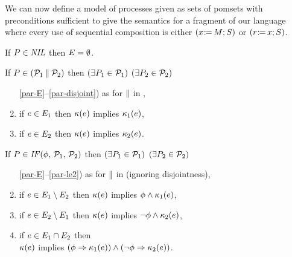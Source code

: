 We can now define a model of processes given as sets of pomsets with preconditions
sufficient to give the semantics for a fragment of our language
where every use of sequential composition is either
$(x\mkern1mu\mathtt{:}\mkern-1mu\mathtt{=}\,M\mathtt{;}\,\allowbreak S)$ or
$(r\mkern1mu\mathtt{:}\mkern-1mu\mathtt{=}\,x\mathtt{;}\,\allowbreak S)$.
\begin{definition}%
  \label{def:pomsets-pre}
  
  \noindent
  If $P\in\textnormal{\textit{NIL}}$ then $E = \emptyset$.

  \noindent
  If $P \in (\mathcal{P}_1\mathbin{\parallel}\mathcal{P}_2)$ then
  $(\exists P_1\in\mathcal{P}_1)$ $(\exists P_2\in\mathcal{P}_2)$
  \begin{enumerate}
    \setcounter{enumi}{\value{pomsetParDisjointCount}}
  \item[\ref{par-E}--\ref{par-disjoint})]
    as for $\mathbin{\parallel}$ in ,
  \item \label{par-kappa1}
    if $e\in E_1$ then $\kappa(e)$ implies $\kappa_1(e)$,
  \item \label{par-kappa2}
    if $e\in E_2$ then $\kappa(e)$ implies $\kappa_2(e)$.
    \setcounter{pomsetPreParCount}{\value{enumi}}
  \end{enumerate}

  \noindent
  If $\aPS \in \sIF{\aForm}\sTHEN\aPSS_1\sELSE\aPSS_2\sFI$ then
  $(\exists P_1\in\mathcal{P}_1)$ $(\exists P_2\in\mathcal{P}_2)$
  \begin{enumerate}
    \setcounter{enumi}{\value{pomsetParCount}}
  \item[\ref{par-E}--\ref{par-le2})] 
    as for $\mathbin{\parallel}$  in  (ignoring disjointness),
  \item \label{if-kappa1}
    if $e\in E_1\setminus E_2$ then $\kappa(e)$ implies $\phi\land\kappa_1(e)$,
  \item \label{if-kappa2}
    if $e\in E_2\setminus E_1$ then $\kappa(e)$ implies $\neg\phi\land\kappa_2(e)$, 
  \item \label{if-kappa12}
    if $e\in E_1\cap E_2$ then\\
    $\kappa(e)$ implies $(\phi\Rightarrow\kappa_1(e))\land(\neg\phi\Rightarrow\kappa_2(e))$.
    \setcounter{pomsetPreIfCount}{\value{enumi}}
  \end{enumerate}


\end{definition}

